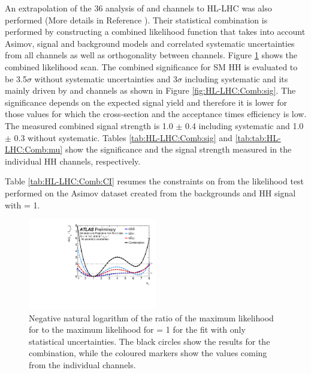 An extrapolation of the 36 \ifb analysis of \bbbb and \bbtt channels to HL-LHC was also performed (More details in Reference ). Their statistical combination is performed by constructing a combined likelihood function that takes into account Asimov, signal and background models and correlated systematic uncertainties from all channels as well as orthogonality between channels. Figure \ref{fig:HL-LHC:Comb:LH} shows the combined likelihood scan. The combined significance for SM HH is evaluated to be 3.5$\sigma$ without systematic uncertainties and 3$\sigma$ including systematic and its mainly driven by \bbtt and \bbyy channels as shown in Figure \ref{fig:HL-LHC:Comb:sig}. The significance depends on the expected signal yield and therefore it is lower for those \kl values for which the cross-section and the acceptance times efficiency is low. The measured combined signal strength is 1.0 $\pm$ 0.4 including systematic and 1.0 $\pm$ 0.3 without systematic. Tables \ref{tab:HL-LHC:Comb:sig} and \ref{tab:tab:HL-LHC:Comb:mu} show the significance and the signal strength measured in the individual HH channels, respectively. 


Table \ref{tab:HL-LHC:Comb:CI} resumes the constraints on \kl from the likelihood test performed on the Asimov dataset created from the backgrounds and HH signal with \kl= 1.  


\begin{figure}[htbp]
    \centering
    \includegraphics[width=0.5\textwidth]{Ch6/Img/figures_combination_bbbb_bbtt_bbyy_lHHH0100_NoSyst_overlay_Preliminary.pdf}
    \caption{Negative natural logarithm of the ratio of the maximum likelihood for \kl to the maximum likelihood for \kl = 1 for the fit with only statistical uncertainties. The black circles show the results for the combination, while the coloured markers show the values coming from the individual channels.}
    \label{fig:HL-LHC:Comb:LH}
\end{figure}

